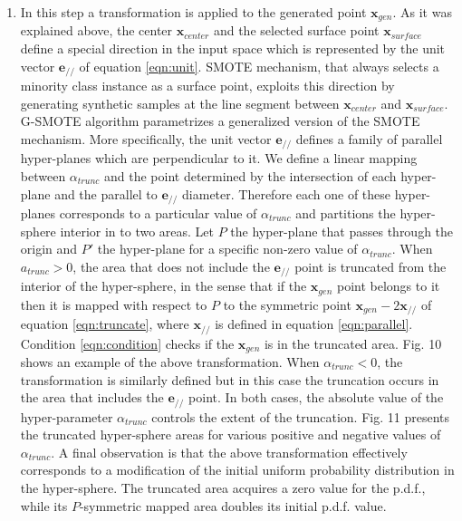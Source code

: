 \documentclass[parskip=full]{scrartcl}
\begin{document}
\begin{enumerate}
	\item In this step a transformation is applied to the generated point
	\(\textbf{x}_{gen} \). As it was explained above, the center
	\(\textbf{x}_{center} \) and the selected surface point
	\(\textbf{x}_{surface} \) define a special direction in the input space
	which is represented by the unit vector \( \textbf{e}_{\scriptscriptstyle//}
	\) of equation \eqref{eqn:unit}. SMOTE mechanism, that always selects a
	minority class instance as a surface point, exploits this direction by
	generating synthetic samples at the line segment between \(
	\textbf{x}_{center} \) and \( \textbf{x}_{surface} \). G-SMOTE algorithm
	parametrizes a generalized version of the SMOTE mechanism. More
	specifically, the unit vector \(\textbf{e}_{\scriptscriptstyle//} \) defines
	a family of parallel hyper-planes which are perpendicular to it. We define a
	linear mapping between \( \alpha_{trunc} \) and the point determined by the
	intersection of each hyper-plane and the parallel to \(
	\textbf{e}_{\scriptscriptstyle//} \) diameter. Therefore each one of these
	hyper-planes corresponds to a particular value of \( \alpha_{trunc} \) and
	partitions the hyper-sphere interior in to two areas. Let \( P \) the
	hyper-plane that passes through the origin and \( P' \) the hyper-plane for
	a specific non-zero value of \(\alpha_{trunc} \). When \( a_{trunc} > 0 \),
	the area that does not include the \( \textbf{e}_{\scriptscriptstyle//} \)
	point is truncated from the interior of the hyper-sphere, in the sense that
	if the \( \textbf{x}_{gen} \) point belongs to it then it is mapped with
	respect to \( P \) to the symmetric point \( \textbf{x}_{gen} - 2
	\textbf{x}_{\scriptscriptstyle//} \) of equation  \eqref{eqn:truncate},
	where \(\textbf{x}_{\scriptscriptstyle//} \) is defined in equation
	\eqref{eqn:parallel}. Condition  \eqref{eqn:condition} checks if  the
	\(\textbf{x}_{gen} \) is in the truncated area. Fig. 10 shows an example of
	the above transformation. When \( \alpha_{trunc} < 0 \), the transformation
	is similarly defined but in this case the truncation occurs in the area that
	includes the \( \textbf{e}_{\scriptscriptstyle//} \) point. In both cases,
	the absolute value of the hyper-parameter \( \alpha_{trunc} \) controls the
	extent of the truncation. Fig. 11 presents the truncated hyper-sphere areas
	for various positive and negative values of \( \alpha_{trunc} \). A final
	observation is that the above transformation effectively corresponds to a
	modification of the initial uniform probability distribution in the
	hyper-sphere. The truncated area acquires a zero value for the p.d.f., while
	its \( P \)-symmetric mapped area doubles its initial p.d.f. value.


\end{enumerate}
\end{document}
